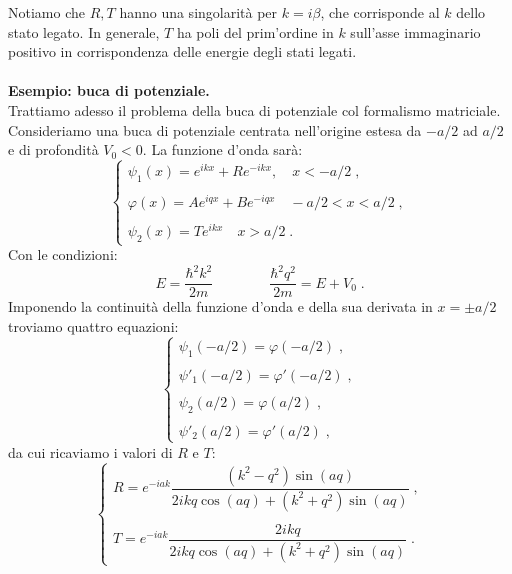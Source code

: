 \documentclass[10pt,a4paper]{report}
\theoremstyle{definition}
\numberwithin{equation}{section}
\begin{document}
Notiamo che $R,T$ hanno una singolarità per $k=i\beta$, che corrisponde al $k$ dello stato legato. In generale, $T$ ha poli del prim'ordine in $k$ sull'asse immaginario positivo in corrispondenza delle energie degli stati legati. \\
\\
\textbf{Esempio: buca di potenziale.} \\
Trattiamo adesso il problema della buca di potenziale col formalismo matriciale. Consideriamo una buca di potenziale centrata nell'origine estesa da $-a/2$ ad $a/2$ e di profondità $V_0<0$. La funzione d'onda sarà:
\begin{equation}
\begin{cases}
\psi_1(x)=e^{ikx}+Re^{-ikx}, \quad x<-a/2\;, \\
\\
\varphi(x)=Ae^{iqx}+Be^{-iqx} \quad -a/2<x<a/2\;, \\
\\
\psi_2(x)=Te^{ikx} \quad x>a/2\;.
\end{cases}
\end{equation}
Con le condizioni:
\begin{equation}
E=\frac{\hbar^2 k^2}{2m} \qquad \qquad \frac{\hbar^2 q^2}{2m}=E+V_0\;.
\end{equation}
Imponendo la continuità della funzione d'onda e della sua derivata in $x=\pm a/2$ troviamo quattro equazioni:
$$
\begin{cases}
\psi_1(-a/2)=\varphi(-a/2)\;, \\
\\
\psi'_1(-a/2)=\varphi'(-a/2)\;, \\
\\
\psi_2(a/2)=\varphi(a/2)\;, \\
\\
\psi'_2(a/2)=\varphi'(a/2)\;,
\end{cases}
$$
da cui ricaviamo i valori di $R$ e $T$:
\begin{equation}
\begin{cases}
R=e^{-iak}\dfrac{(k^2-q^2)\sin(aq)}{2ikq\cos(aq)+(k^2+q^2)\sin(aq)}\;, \\
\\
T=e^{-iak}\dfrac{2ikq}{2ikq\cos(aq)+(k^2+q^2)\sin(aq)}\;.
\end{cases}
\end{equation}
\end{document}
